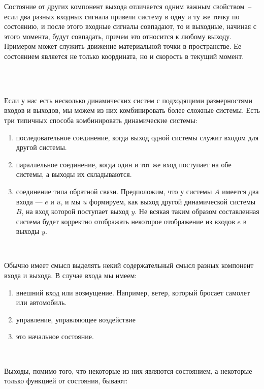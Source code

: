 Состояние от других компонент выхода отличается одним важным свойством – если два разных входных сигнала привели систему в одну и ту же точку по состоянию, и после этого входные сигналы совпадают, то и выходные, начиная с этого момента, будут совпадать, причем это относится к любому выходу. Примером может служить движение материальной точки в пространстве. Ее состоянием является не только координата, но и скорость в текущий момент. \\

\

\

Если у нас есть несколько динамических систем с подходящими размерностями входов и выходов, мы можем из них комбинировать более сложные системы. Есть три типичных способа комбинировать динамические системы: \\

\begin{enumerate}
  \item последовательное соединение, когда выход одной системы служит входом для другой системы.
  \item параллельное соединение, когда один и тот же вход поступает на обе системы, а выходы их складываются.
  \item соединение типа обратной связи. Предположим, что у системы $A$ имеется два входа — $e$ и $u$, и мы $u$ формируем, как выход другой динамической системы $B$, на вход которой поступает выход $y$. Не всякая таким образом составленная система будет корректно отображать некоторое отображение из входов $e$ в выходы $y$.
\end{enumerate}
\

Обычно имеет смысл выделять некий содержательный смысл разных компонент входа и выхода. В случае входа мы имеем: \\

\begin{enumerate}
  \item внешний вход или возмущение. Например, ветер, который бросает самолет или автомобиль. 
  \item управление, управляющее воздействие
  \item это начальное состояние.
\end{enumerate}
\

Выходы, помимо того, что некоторые из них являются состоянием, а некоторые только функцией от состояния, бывают: \\

